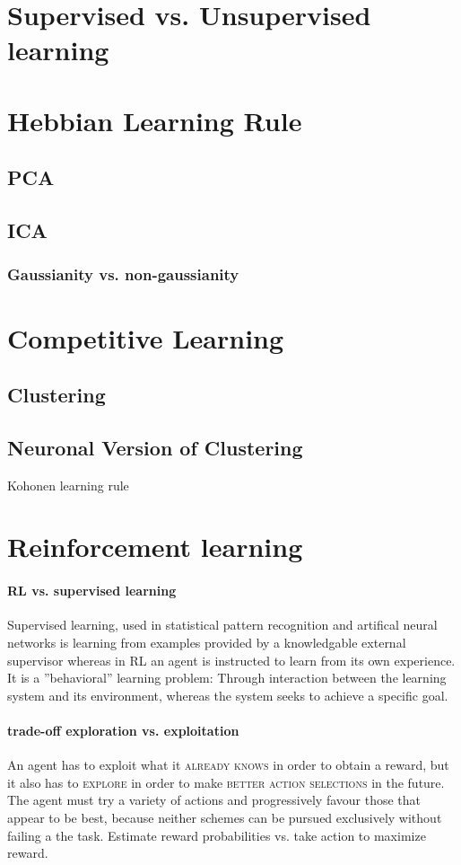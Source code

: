 \documentclass[11pt]{article}
\begin{document}
\section{Supervised vs. Unsupervised learning}

\section{Hebbian Learning Rule}
\subsection{PCA}
\subsection{ICA}
\subsubsection*{Gaussianity vs. non-gaussianity}

\section{Competitive Learning}
\subsection{Clustering}
\subsection{Neuronal Version of Clustering}
Kohonen learning rule

\section{Reinforcement learning}

\paragraph{RL vs. supervised learning}
Supervised learning, used in statistical pattern recognition and artifical neural networks is learning from examples provided by a knowledgable external supervisor whereas in RL an agent is instructed to learn from its own experience. It is a ''behavioral'' learning problem: Through interaction between the learning system and its environment, whereas the system seeks to achieve a specific goal.

\paragraph{trade-off exploration vs. exploitation}
An agent has to exploit what it \textsc{already knows} in order to obtain a reward, but it also has to \textsc{explore} in order to make \textsc{better action selections} in the future. The agent must try a variety of actions and progressively favour those that appear to be best, because neither schemes can be pursued exclusively without failing a the task. Estimate reward probabilities vs. take action to maximize reward.
\end{document}
